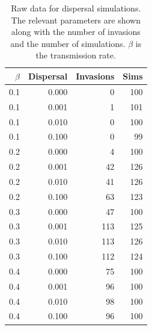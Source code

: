 







































\clearpage
\begin{table}[ht]
\centering
\caption[
Raw data for dispersal simulations
  ]{
Raw data for dispersal simulations.
The relevant parameters are shown along with the number of invasions and the number of simulations.
$\beta$ is the transmission rate.
} 
\label{B-disp}
\begingroup\small
\begin{tabular}{@{}rrrr@{}}
  \toprule
$\beta$ & Dispersal & Invasions & Sims \\ 
  \midrule
0.1 & 0.000 & 0 & 100 \\ 
  0.1 & 0.001 & 1 & 101 \\ 
  0.1 & 0.010 & 0 & 100 \\ 
  0.1 & 0.100 & 0 & 99 \\ 
  0.2 & 0.000 & 4 & 100 \\ 
  0.2 & 0.001 & 42 & 126 \\ 
  0.2 & 0.010 & 41 & 126 \\ 
  0.2 & 0.100 & 63 & 123 \\ 
  0.3 & 0.000 & 47 & 100 \\ 
  0.3 & 0.001 & 113 & 125 \\ 
  0.3 & 0.010 & 113 & 126 \\ 
  0.3 & 0.100 & 112 & 124 \\ 
  0.4 & 0.000 & 75 & 100 \\ 
  0.4 & 0.001 & 96 & 100 \\ 
  0.4 & 0.010 & 98 & 100 \\ 
  0.4 & 0.100 & 96 & 100 \\ 
   \bottomrule
\end{tabular}
\endgroup
\end{table}





